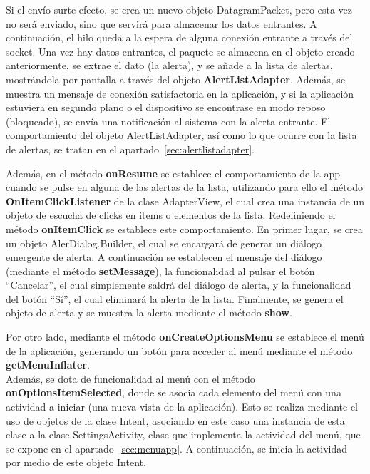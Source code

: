         Si el envío surte efecto, se crea un nuevo objeto DatagramPacket, pero esta vez no será enviado, sino que servirá para almacenar los datos entrantes. A continuación, el hilo queda a la espera de alguna conexión entrante a través del socket. Una vez hay datos entrantes, el paquete se almacena en el objeto creado anteriormente, se extrae el dato (la alerta), y se añade a la lista de alertas, mostrándola por pantalla a través del objeto \textbf{AlertListAdapter}. Además, se muestra un mensaje de conexión satisfactoria en la aplicación, y si la aplicación estuviera en segundo plano o el dispositivo se encontrase en modo reposo (bloqueado), se envía una notificación al sistema con la alerta entrante. El comportamiento del objeto AlertListAdapter, así como lo que ocurre con la lista de alertas, se tratan en el apartado~\ref{sec:alertlistadapter}. \\

        \vspace{0.3cm}

        Además, en el método \textbf{onResume} se establece el comportamiento de la app cuando se pulse en alguna de las alertas de la lista, utilizando para ello el método \textbf{OnItemClickListener} de la clase AdapterView, el cual crea una instancia de un objeto de escucha de clicks en items o elementos de la lista. Redefiniendo el método \textbf{onItemClick} se establece este comportamiento. En primer lugar, se crea un objeto AlerDialog.Builder, el cual se encargará de generar un diálogo emergente de alerta. A continuación se establecen el mensaje del diálogo (mediante el método \textbf{setMessage}), la funcionalidad al pulsar el botón ``Cancelar'', el cual simplemente saldrá del diálogo de alerta, y la funcionalidad del botón ``Sí'', el cual eliminará la alerta de la lista. Finalmente, se genera el objeto de alerta y se muestra la alerta mediante el método \textbf{show}. \\

        \vspace{0.3cm}

        Por otro lado, mediante el método \textbf{onCreateOptionsMenu} se establece el menú de la aplicación, generando un botón para acceder al menú mediante el método \textbf{getMenuInflater}. \\

        Además, se dota de funcionalidad al menú con el método \textbf{onOptionsItemSelected}, donde se asocia cada elemento del menú con una actividad a iniciar (una nueva vista de la aplicación). Esto se realiza mediante el uso de objetos de la clase Intent, asociando en este caso una instancia de esta clase a la clase SettingsActivity, clase que implementa la actividad del menú, que se expone en el apartado~\ref{sec:menuapp}. A continuación, se inicia la actividad por medio de este objeto Intent. \\


